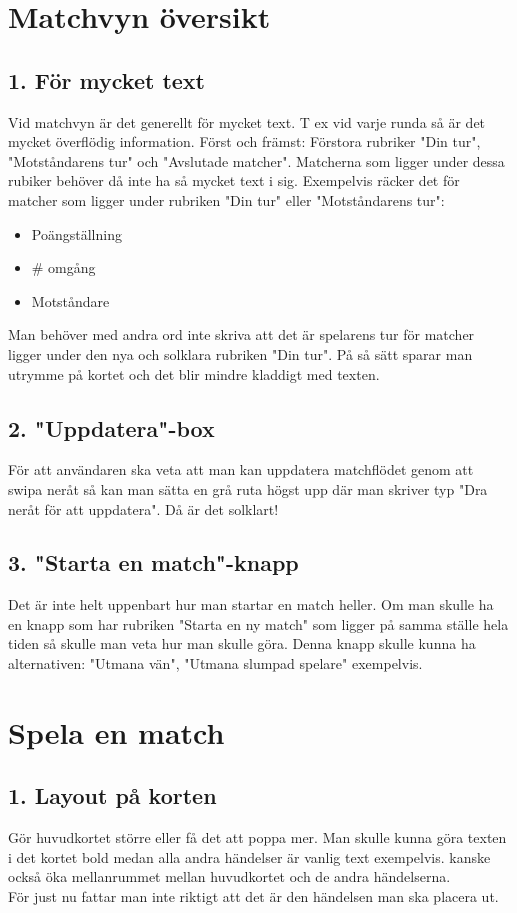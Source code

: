 \documentclass[11pt,a4paper]{article}
\author{FipparN}
\begin{document}
\section{Matchvyn översikt}
\subsection{1. För mycket text}
Vid matchvyn är det generellt för mycket text. T ex vid varje runda så är det mycket överflödig information. 
Först och främst: Förstora rubriker "Din tur", "Motståndarens tur" och "Avslutade matcher". Matcherna som ligger under dessa rubiker behöver då inte ha så mycket text i sig. Exempelvis räcker det för matcher som ligger under rubriken "Din tur" eller "Motståndarens tur":
\begin{itemize}
\item Poängställning
\item # omgång
\item Motståndare
\end{itemize}
Man behöver med andra ord inte skriva att det är spelarens tur för matcher ligger under den nya och solklara rubriken "Din tur". På så sätt sparar man utrymme på kortet och det blir mindre kladdigt med texten.\\

\subsection{2. "Uppdatera"-box}
För att användaren ska veta att man kan uppdatera matchflödet genom att swipa neråt så kan man sätta en grå ruta högst upp där man skriver typ "Dra neråt för att uppdatera". Då är det solklart!

\subsection{3. "Starta en match"-knapp}
Det är inte helt uppenbart hur man startar en match heller. Om man skulle ha en knapp som har rubriken "Starta en ny match" som ligger på samma ställe hela tiden så skulle man veta hur man skulle göra. Denna knapp skulle kunna ha alternativen: "Utmana vän", "Utmana slumpad spelare" exempelvis.

\section{Spela en match}
\subsection{1. Layout på korten}
Gör huvudkortet större eller få det att poppa mer. Man skulle kunna göra texten i det kortet bold medan alla andra händelser är vanlig text exempelvis. kanske också öka mellanrummet mellan huvudkortet och de andra händelserna.\\
För just nu fattar man inte riktigt att det är den händelsen man ska placera ut.
\end{document}

